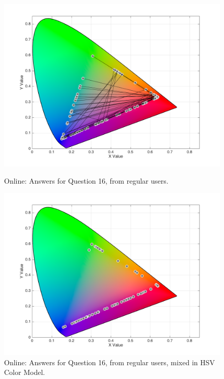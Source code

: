 \begin{figure}[htbp]
  \centering
  \vspace{-15pt}
  \begin{minipage}{0.48\textwidth}
    \centering
    \includegraphics[width=\textwidth]{images/results/16_online_regularUsers.png}
    \caption[Online: Answers for Question 16, from regular users.]{Online: Answers for Question 16, from regular users.}
    \label{fig:onlineregular_16}
  \end{minipage}\hfill
  \begin{minipage}{0.48\textwidth}
    \centering
    \includegraphics[width=\textwidth]{images/results/16_online_HSVresponses.png}
    \caption[Online: Answers for Question 16, from regular users, mixed in HSV Color Model.]{Online: Answers for Question 16, from regular users, mixed in HSV Color Model.}
    \label{fig:onlinehsvregular_16}
  \end{minipage}
  \vspace{-5pt}
\end{figure}
%
